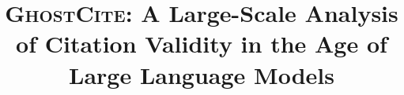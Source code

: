 \documentclass[conference]{style/IEEEtran}
\begin{document}
\title{\textsc{GhostCite}: A Large-Scale Analysis of Citation Validity in the Age of Large Language Models}

\author{}


\maketitle




\IEEEpeerreviewmaketitle

















\appendix

\end{document}
